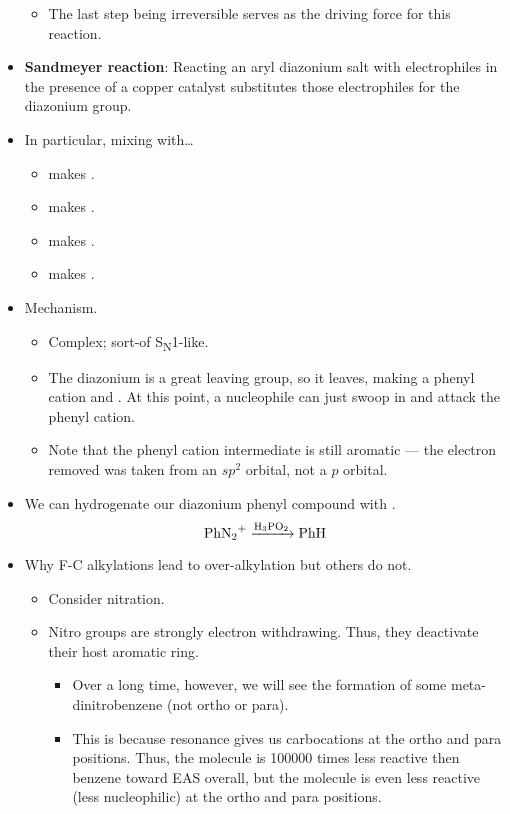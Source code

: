 \documentclass[../notes.tex]{subfiles}
\begin{document}
\begin{itemize}
\begin{itemize}
        \item The last step being irreversible serves as the driving force for this reaction.
    \end{itemize}
    \item \textbf{Sandmeyer reaction}: Reacting an aryl diazonium salt with electrophiles in the presence of a copper catalyst substitutes those electrophiles for the diazonium group.
    \item In particular, mixing  with\dots
    \begin{itemize}
        \item {} makes .
        \item {} makes .
        \item {} makes .
        \item {} makes .
    \end{itemize}
    \item Mechanism.
    \begin{itemize}
        \item Complex; sort-of S\textsubscript{N}1-like.
        \item The diazonium is a great leaving group, so it leaves, making a phenyl cation and . At this point, a nucleophile can just swoop in and attack the phenyl cation.
        \item Note that the phenyl cation intermediate is still aromatic --- the electron removed was taken from an $sp^2$ orbital, not a $p$ orbital.
    \end{itemize}
    \item We can hydrogenate our diazonium phenyl compound with .
    \begin{equation*}
        \ce{PhN2+ ->[H3PO2] PhH}
    \end{equation*}
    \item Why F-C alkylations lead to over-alkylation but others do not.
    \begin{itemize}
        \item Consider nitration.
        \item Nitro groups are strongly electron withdrawing. Thus, they deactivate their host aromatic ring.
        \begin{itemize}
            \item Over a long time, however, we will see the formation of some meta-dinitrobenzene (not ortho or para).
            \item This is because resonance gives us carbocations at the ortho and para positions. Thus, the molecule is \num{100000} times less reactive then benzene toward EAS overall, but the molecule is even less reactive (less nucleophilic) at the ortho and para positions.

\end{itemize}
\end{itemize}
\end{itemize}
\end{document}
